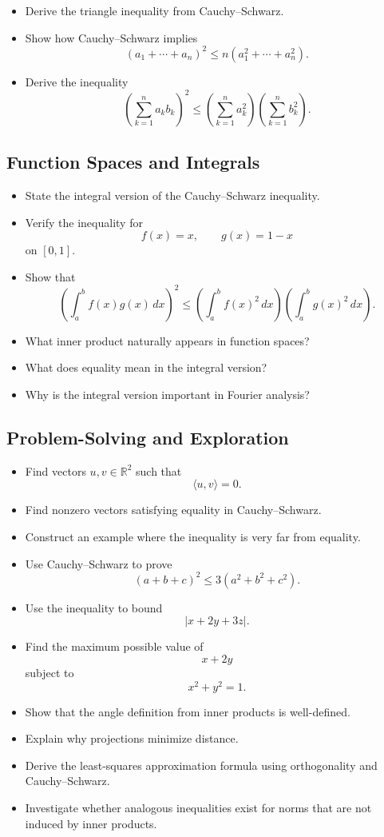 \begin{itemize}[resume]
  \item Derive the triangle inequality from Cauchy--Schwarz.
  \item Show how Cauchy--Schwarz implies
    \[
      (a_1+\cdots+a_n)^2 \le n(a_1^2+\cdots+a_n^2).
    \]
  \item Derive the inequality
    \[
      \left(\sum_{k=1}^n a_k b_k\right)^2
      \le
      \left(\sum_{k=1}^n a_k^2\right)
      \left(\sum_{k=1}^n b_k^2\right).
    \]
\end{itemize}

\subsection{Function Spaces and Integrals}

\begin{itemize}[resume]
  \item State the integral version of the Cauchy--Schwarz inequality.
  \item Verify the inequality for
    \[
      f(x)=x, \qquad g(x)=1-x
    \]
    on $[0,1]$.
  \item Show that
    \[
      \left(\int_a^b f(x)g(x)\,dx\right)^2
      \le
      \left(\int_a^b f(x)^2\,dx\right)
      \left(\int_a^b g(x)^2\,dx\right).
    \]
  \item What inner product naturally appears in function spaces?
  \item What does equality mean in the integral version?
  \item Why is the integral version important in Fourier analysis?
\end{itemize}

\subsection{Problem-Solving and Exploration}

\begin{itemize}[resume]
  \item Find vectors $u,v \in \mathbb{R}^2$ such that
    \[
      \langle u,v\rangle = 0.
    \]
  \item Find nonzero vectors satisfying equality in Cauchy--Schwarz.
  \item Construct an example where the inequality is very far from equality.
  \item Use Cauchy--Schwarz to prove
    \[
      (a+b+c)^2 \le 3(a^2+b^2+c^2).
    \]
  \item Use the inequality to bound
    \[
      |x+2y+3z|.
    \]
  \item Find the maximum possible value of
    \[
      x+2y
    \]
    subject to
    \[
      x^2+y^2=1.
    \]
  \item Show that the angle definition from inner products is well-defined.
  \item Explain why projections minimize distance.
  \item Derive the least-squares approximation formula using orthogonality and Cauchy--Schwarz.
  \item Investigate whether analogous inequalities exist for norms that are not induced by inner products.
\end{itemize}
